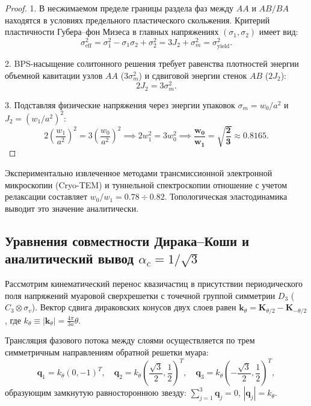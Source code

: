 \documentclass[12pt,a4paper]{article}
\begin{document}
	\begin{proof}
		1. В несжимаемом пределе границы раздела фаз между $AA$ и $AB/BA$ находятся в условиях предельного пластического скольжения. Критерий пластичности Губера--фон Мизеса в главных напряжениях $(\sigma_1, \sigma_2)$ имеет вид:
		\begin{equation}
			\sigma_{\text{eff}}^2 = \sigma_1^2 - \sigma_1 \sigma_2 + \sigma_2^2 = 3 J_2 + \sigma_m^2 = \sigma_{\text{yield}}^2.
		\end{equation}
		
		2. BPS-насыщение солитонного решения требует равенства плотностей энергии объемной кавитации узлов $AA$ ($3\sigma_m^2$) и сдвиговой энергии стенок $AB$ ($2J_2$):
		\begin{equation}
			2 J_2 = 3 \sigma_m^2.
		\end{equation}
		
		3. Подставляя физические напряжения через энергии упаковок $\sigma_m = w_0 / a^2$ и $J_2 = (w_1 / a^2)^2$:
		\begin{equation}
			2 \left( \frac{w_1}{a^2} \right)^2 = 3 \left( \frac{w_0}{a^2} \right)^2 \implies 2 w_1^2 = 3 w_0^2 \implies \mathbf{\frac{w_0}{w_1} = \sqrt{\frac{2}{3}} \approx 0.8165}.
		\end{equation}
	\end{proof}
	
	Экспериментально извлеченное методами трансмиссионной электронной микроскопии (Cryo-TEM) и туннельной спектроскопии отношение с учетом релаксации составляет $w_0/w_1 = 0.78 \div 0.82$. Топологическая эластодинамика выводит это значение аналитически.
		
	\subsection{Уравнения совместности Дирака--Коши и аналитический вывод $\alpha_c = 1/\sqrt{3}$}
	
	Рассмотрим кинематический перенос квазичастиц в присутствии периодического поля напряжений муаровой сверхрешетки с точечной группой симметрии $D_3$ ($C_3 \otimes \sigma_v$). Вектор сдвига дираковских конусов двух слоев равен $\mathbf{k}_\theta = \mathbf{K}_{\theta/2} - \mathbf{K}_{-\theta/2}$, где $k_\theta \equiv |\mathbf{k}_\theta| = \frac{4\pi}{3 a} \theta$.
	
	Трансляция фазового потока между слоями осуществляется по трем симметричным направлениям обратной решетки муара:
	\begin{equation}
		\mathbf{q}_1 = k_\theta (0, -1)^T, \quad \mathbf{q}_2 = k_\theta \left(\frac{\sqrt{3}}{2}, \frac{1}{2}\right)^T, \quad \mathbf{q}_3 = k_\theta \left(-\frac{\sqrt{3}}{2}, \frac{1}{2}\right)^T,
	\end{equation}
	образующим замкнутую равностороннюю звезду: $\sum_{j=1}^3 \mathbf{q}_j = 0$, $|\mathbf{q}_j| = k_\theta$.
	
\end{document}
